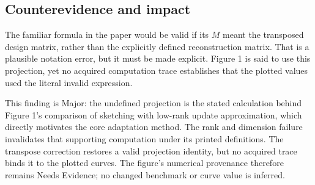 \documentclass[10pt]{article}
\begin{document}
\subsection*{Counterevidence and impact}
The familiar formula in the paper would be valid if its \(M\) meant the transposed design matrix, rather than the explicitly defined reconstruction matrix. That is a plausible notation error, but it must be made explicit. Figure 1 is said to use this projection, yet no acquired computation trace establishes that the plotted values used the literal invalid expression.\par
This finding is Major: the undefined projection is the stated calculation behind Figure 1’s comparison of sketching with low-rank update approximation, which directly motivates the core adaptation method. The rank and dimension failure invalidates that supporting computation under its printed definitions. The transpose correction restores a valid projection identity, but no acquired trace binds it to the plotted curves. The figure’s numerical provenance therefore remains Needs Evidence; no changed benchmark or curve value is inferred.\par
\end{document}
